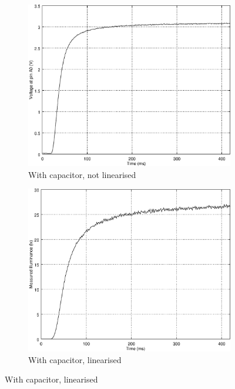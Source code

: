 \begin{figure}[h]
    \centering
    \begin{subfigure}[t]{0.49\textwidth}
	\centering
	\includegraphics[width=.95\textwidth]{img/step_response}
	\caption{With capacitor, not linearised}
	\label{fig:step_response}
    \end{subfigure}
    \begin{subfigure}[t]{0.49\textwidth}
	\centering
	\includegraphics[width=.95\textwidth]{img/step_response_linearised}
	\caption{With capacitor, linearised}
	\label{fig:step_response_linearised}
    \end{subfigure}


\end{figure}
